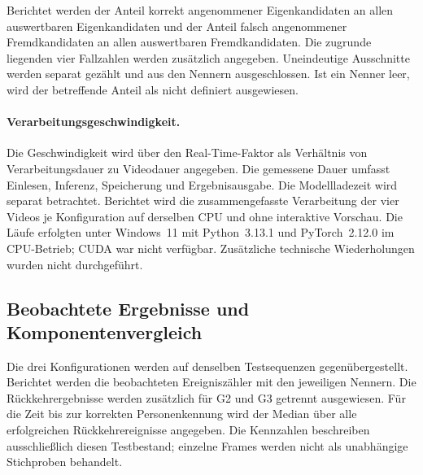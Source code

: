 \documentclass[runningheads,a4paper]{llncs}
\begin{document}
Berichtet werden der Anteil korrekt angenommener Eigenkandidaten an allen auswertbaren Eigenkandidaten und der Anteil falsch angenommener Fremdkandidaten an allen auswertbaren Fremdkandidaten. Die zugrunde liegenden vier Fallzahlen werden zusätzlich angegeben. Uneindeutige Ausschnitte werden separat gezählt und aus den Nennern ausgeschlossen. Ist ein Nenner leer, wird der betreffende Anteil als nicht definiert ausgewiesen.

\paragraph{Verarbeitungsgeschwindigkeit.}
Die Geschwindigkeit wird über den Real-Time-Faktor als Verhältnis von Verarbeitungsdauer zu Videodauer angegeben. Die gemessene Dauer umfasst Einlesen, Inferenz, Speicherung und Ergebnisausgabe. Die Modellladezeit wird separat betrachtet. Berichtet wird die zusammengefasste Verarbeitung der vier Videos je Konfiguration auf derselben CPU und ohne interaktive Vorschau. Die Läufe erfolgten unter Windows~11 mit Python~3.13.1 und PyTorch~2.12.0 im CPU-Betrieb; CUDA war nicht verfügbar. Zusätzliche technische Wiederholungen wurden nicht durchgeführt.

\subsection{Beobachtete Ergebnisse und Komponentenvergleich}

Die drei Konfigurationen werden auf denselben Testsequenzen gegenübergestellt. Berichtet werden die beobachteten Ereigniszähler mit den jeweiligen Nennern. Die Rückkehrergebnisse werden zusätzlich für G2 und G3 getrennt ausgewiesen. Für die Zeit bis zur korrekten Personenkennung wird der Median über alle erfolgreichen Rückkehrereignisse angegeben. Die Kennzahlen beschreiben ausschlie{\ss}lich diesen Testbestand; einzelne Frames werden nicht als unabhängige Stichproben behandelt.
\end{document}
